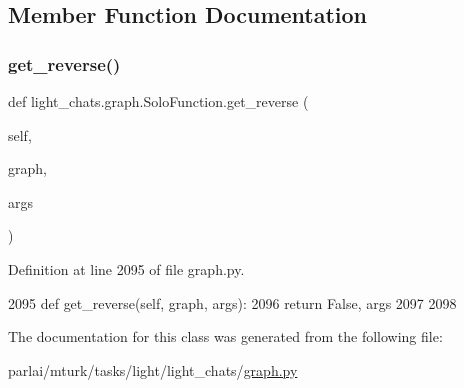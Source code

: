 \subsection{Member Function Documentation}
\mbox{\label{classlight__chats_1_1graph_1_1SoloFunction_a58d8ebb8b70a1be31dd9361f19552a1b}} 
\subsubsection{\texorpdfstring{get\+\_\+reverse()}{get\_reverse()}}
{\footnotesize\ttfamily def light\+\_\+chats.\+graph.\+Solo\+Function.\+get\+\_\+reverse (\begin{DoxyParamCaption}\item[{}]{self,  }\item[{}]{graph,  }\item[{}]{args }\end{DoxyParamCaption})}



Definition at line 2095 of file graph.\+py.


\begin{DoxyCode}
2095     \textcolor{keyword}{def }get\_reverse(self, graph, args):
2096         \textcolor{keywordflow}{return} \textcolor{keyword}{False}, args
2097 
2098 
\end{DoxyCode}


The documentation for this class was generated from the following file\+:\begin{DoxyCompactItemize}
\item 
parlai/mturk/tasks/light/light\+\_\+chats/\hyperlink{parlai_2mturk_2tasks_2light_2light__chats_2graph_8py}{graph.\+py}\end{DoxyCompactItemize}

